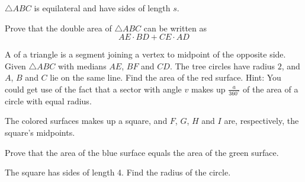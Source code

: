 $ \triangle ABC $ is equilateral and have sides of length $ s $. 

\newpage
{}
Prove that the double area of $ \triangle ABC $ can be written as
\[ AE\cdot BD + CE\cdot AD \]

A  of a triangle is a segment joining a vertex to midpoint of the opposite side. 
Given $ \triangle ABC $ with medians $ AE $, $ BF $ and $ CD $. 
\newpage
{}
The tree circles have radius $ 2 $, and $ A $, $ B $ and $ C $ lie on the same line. Find the area of the red surface.
{\footnotesize Hint: You could get use of the fact that a sector with angle $ v $ makes up $ \frac{a}{360^\circ} $ of the area of a circle with equal radius.}

The colored surfaces makes up a square, and $ F $, $ G $, $ H $ and $ I $ are, respectively, the square's midpoints.\os

Prove that the area of the blue surface equals the area of the green surface.

The square has sides of length 4. Find the radius of the circle.

